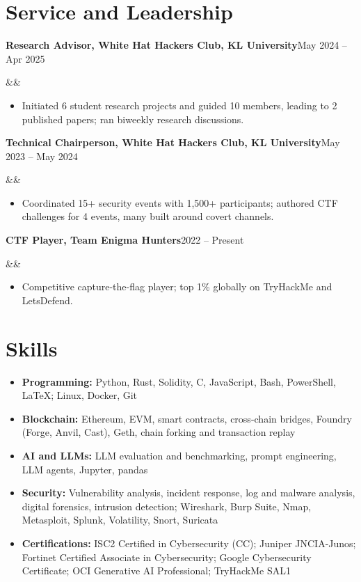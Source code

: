 \documentclass[10pt]{article}
\newcommand{\entry}[3]{%
  \textbf{#1}\hfill{\color{muted}#2}\par
  \ifx&#3&\else{\itshape #3}\par\fi\vspace{-0.1em}}
\begin{document}
\section{Service and Leadership}
\entry{Research Advisor, White Hat Hackers Club, KL University}{May 2024 -- Apr 2025}{}
\begin{itemize}
  \item Initiated 6 student research projects and guided 10 members, leading to 2 published papers; ran biweekly research discussions.
\end{itemize}
\vspace{0.3em}
\entry{Technical Chairperson, White Hat Hackers Club, KL University}{May 2023 -- May 2024}{}
\begin{itemize}
  \item Coordinated 15+ security events with 1,500+ participants; authored CTF challenges for 4 events, many built around covert channels.
\end{itemize}
\vspace{0.3em}
\entry{CTF Player, Team Enigma Hunters}{2022 -- Present}{}
\begin{itemize}
  \item Competitive capture-the-flag player; top 1\% globally on TryHackMe and LetsDefend.
\end{itemize}

\section{Skills}
\begin{itemize}
  \item \textbf{Programming:} Python, Rust, Solidity, C, JavaScript, Bash, PowerShell, LaTeX; Linux, Docker, Git
  \item \textbf{Blockchain:} Ethereum, EVM, smart contracts, cross-chain bridges, Foundry (Forge, Anvil, Cast), Geth, chain forking and transaction replay
  \item \textbf{AI and LLMs:} LLM evaluation and benchmarking, prompt engineering, LLM agents, Jupyter, pandas
  \item \textbf{Security:} Vulnerability analysis, incident response, log and malware analysis, digital forensics, intrusion detection; Wireshark, Burp Suite, Nmap, Metasploit, Splunk, Volatility, Snort, Suricata
  \item \textbf{Certifications:} ISC2 Certified in Cybersecurity (CC); Juniper JNCIA-Junos; Fortinet Certified Associate in Cybersecurity; Google Cybersecurity Certificate; OCI Generative AI Professional; TryHackMe SAL1
\end{itemize}
\end{document}
